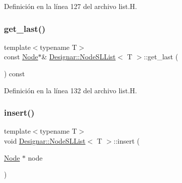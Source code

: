 Definición en la línea 127 del archivo list.\+H.

\mbox{\label{class_designar_1_1_node_s_l_list_acce6901e0e50d718aeff268506b6f2f1}} 
\subsubsection{\texorpdfstring{get\+\_\+last()}{get\_last()}\hspace{0.1cm}{\footnotesize\ttfamily [2/2]}}
{\footnotesize\ttfamily template$<$typename T$>$ \\
const \hyperlink{class_designar_1_1_node_s_l_list_a41963019ada1025099e3259207a3de96}{Node}$\ast$\& \hyperlink{class_designar_1_1_node_s_l_list}{Designar\+::\+Node\+S\+L\+List}$<$ T $>$\+::get\+\_\+last (\begin{DoxyParamCaption}{ }\end{DoxyParamCaption}) const\hspace{0.3cm}{\ttfamily [inline]}}



Definición en la línea 132 del archivo list.\+H.

\mbox{\label{class_designar_1_1_node_s_l_list_aa6b522a7d687f39959d93ebc80903261}} 
\subsubsection{\texorpdfstring{insert()}{insert()}}
{\footnotesize\ttfamily template$<$typename T$>$ \\
void \hyperlink{class_designar_1_1_node_s_l_list}{Designar\+::\+Node\+S\+L\+List}$<$ T $>$\+::insert (\begin{DoxyParamCaption}\item[{\hyperlink{class_designar_1_1_node_s_l_list_a41963019ada1025099e3259207a3de96}{Node} $\ast$}]{node }\end{DoxyParamCaption})\hspace{0.3cm}{\ttfamily [inline]}}



